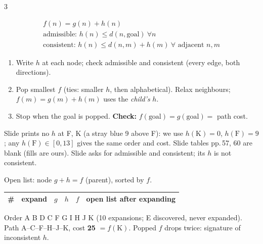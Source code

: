 \begin{multicols}{3}
\label{w12:astar}
\begin{fbx}[A* priority \pg{59}]
\begin{gather*}f(n)=g(n)+h(n)\\ \text{admissible: }h(n)\le d(n,\text{goal})\ \forall n\\ \text{consistent: }h(n)\le d(n,m)+h(m)\ \forall\text{ adjacent }n,m\end{gather*}
\end{fbx}
\begin{recipe}[A*]
\begin{enumerate}
\item Write $h$ at each node; check admissible and consistent (every edge, both directions).
\item Pop smallest $f$ (ties: smaller $h$, then alphabetical). Relax neighbours; $f(m)=g(m)+h(m)$ uses the \emph{child's} $h$.
\item Stop when the goal is popped. \textbf{Check:} $f(\text{goal})=g(\text{goal})=$ path cost.
\end{enumerate}
\end{recipe}
\begin{slideerr}[pp.\,56--60]
Slide prints no $h$ at F, K (a stray blue 9 above F): we use $h(\text{K})=0$, $h(\text{F})=9$; any $h(\text{F})\in[0,13]$ gives the same order and cost. Slide tables pp.\,57, 60 are blank (fills are ours). Slide asks for admissible and consistent; its $h$ is not consistent.
\end{slideerr}
\begin{worked}[SAMPLE 4a: A*, A to K]
Open list: node $g{+}h{=}f$ (parent), sorted by $f$.\par\vspace{1pt}
\scriptsize\setlength{\tabcolsep}{1.5pt}
\begin{tabularx}{\linewidth}{@{}rcccc>{\raggedright\arraybackslash}X@{}}\toprule
\# & expand & $g$ & $h$ & $f$ & open list after expanding\\\midrule
\bottomrule\end{tabularx}\par\vspace{1pt}
Order A B D C F G I H J K (10 expansions; E discovered, never expanded). Path A--C--F--H--J--K, cost \textbf{25} $=f(\text{K})$. Popped $f$ drops twice: signature of inconsistent $h$. \chk

\end{worked}
\end{multicols}
